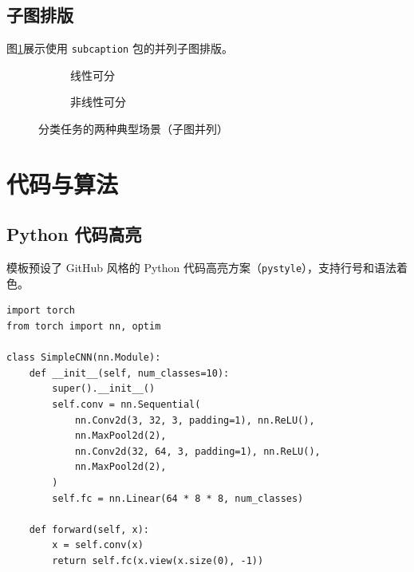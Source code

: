 \documentclass{harryopo-paper}
\begin{document}
\subsection{子图排版}

图\ref{fig:subfig}展示使用 \texttt{subcaption} 包的并列子图排版。

\begin{figure}[htbp]
\centering
\begin{subfigure}{0.45\textwidth}
\centering
{}
\caption{线性可分}
\end{subfigure}
\hfill
\begin{subfigure}{0.45\textwidth}
\centering
{}
\caption{非线性可分}
\end{subfigure}
\caption{分类任务的两种典型场景（子图并列）}
\label{fig:subfig}
\end{figure}

\section{代码与算法}
\label{sec:code}

\subsection{Python 代码高亮}

模板预设了 GitHub 风格的 Python 代码高亮方案（\texttt{pystyle}），支持行号和语法着色。

\begin{lstlisting}[style=pystyle, caption={Python 示例：SGD 优化器实现}, label=lst:python]
import torch
from torch import nn, optim

class SimpleCNN(nn.Module):
    def __init__(self, num_classes=10):
        super().__init__()
        self.conv = nn.Sequential(
            nn.Conv2d(3, 32, 3, padding=1), nn.ReLU(),
            nn.MaxPool2d(2),
            nn.Conv2d(32, 64, 3, padding=1), nn.ReLU(),
            nn.MaxPool2d(2),
        )
        self.fc = nn.Linear(64 * 8 * 8, num_classes)

    def forward(self, x):
        x = self.conv(x)
        return self.fc(x.view(x.size(0), -1))
\end{lstlisting}
\end{document}
